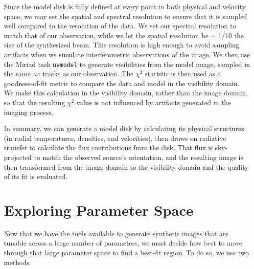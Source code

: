Since the model disk is fully defined at every point in both physical and velocity space, we may set the spatial and spectral resolution to ensure that it is sampled well compared to the resolution of the data. We set our spectral resolution to match that of our observation, while we let the spatial resolution be $\sim$ 1/10 the size of the synthesized beam. This resolution is high enough to avoid sampling artifacts when we simulate interferometric observations of the image. We then use the Miriad task \texttt{uvmodel} to generate visibilities from the model image, sampled in the same $uv$ tracks as our observation. The $\chi^2$ statistic is then used as a goodness-of-fit metric to compare the data and model in the visibility domain. We make this calculation in the visibility domain, rather than the image domain, so that the resulting $\chi^2$ value is not influenced by artifacts generated in the imaging process.


In summary, we can generate a model disk by calculating its physical structures (in radial temperatures, densities, and velocities), then draws on radiative transfer to calculate the flux contributions from the disk. That flux is sky-projected to match the observed source's orientation, and the resulting image is then transformed from the image domain to the visibility domain and the quality of its fit is evaluated.



\section{Exploring Parameter Space}
\label{section:param_space}

Now that we have the tools available to generate synthetic images that are tunable across a large number of parameters, we must decide how best to move through that large parameter space to find a best-fit region. To do so, we use two methods.

